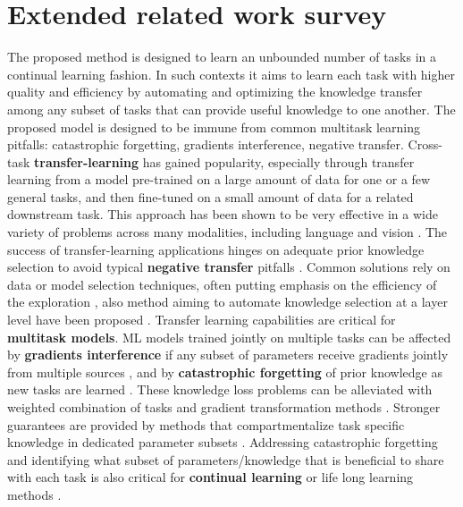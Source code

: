 \documentclass{article} \usepackage{iclr2023_conference,times}
\begin{document}
\section{Extended related work survey}
\label{sec:ex-rel}
The proposed method is designed to learn an unbounded number of tasks in a continual learning fashion.
In such contexts it aims to learn each task with higher quality and efficiency by automating and optimizing the knowledge transfer among any subset of tasks that can provide useful knowledge to one another.
The proposed model is designed to be immune from common multitask learning pitfalls: catastrophic forgetting, gradients interference, negative transfer. 
Cross-task \textbf{transfer-learning}
has gained popularity, especially through transfer learning from a model
pre-trained on a large amount of data for one or a few general tasks,
and then fine-tuned on a small amount of data for a related downstream task.
This approach has been shown to be very effective in a wide variety of problems
across many modalities, including
language \citep{Devlin2019BERTPO,Raffel2020ExploringTL} and vision \citep{Dosovitskiy2021AnII,He2016DeepRL}.
The success of transfer-learning applications hinges on adequate prior knowledge selection to avoid typical \textbf{negative transfer} pitfalls \citep{Rosenstein2005ToTO,Wang2019CharacterizingAA}.
Common solutions rely on data or model selection techniques,
often putting emphasis on the efficiency of the exploration
\citep{Zhang2020ASO,Mensink2021FactorsOI}, also method aiming to automate knowledge selection at a layer level have been proposed \citet{Sun2020AdaShareLW}.
Transfer learning capabilities are critical for \textbf{multitask models}.
ML models trained jointly on multiple tasks 
can be affected by \textbf{gradients interference} if any subset of parameters receive gradients jointly from multiple sources \citep{Chen2018GradNormGN,Yu2020GradientSF}, and by \textbf{catastrophic forgetting} of prior knowledge as new tasks are learned \citep{McCloskey1989CatastrophicII,French1999CatastrophicFI}.
These knowledge loss problems can be alleviated with weighted combination of tasks \citep{Liu2019LossBalancedTW,Sun2020ERNIE2A} and gradient transformation methods \citep{Chen2018GradNormGN,Sener2018MultiTaskLA,Kendall2018MultitaskLU}.
Stronger guarantees are provided by methods that compartmentalize task specific knowledge in dedicated parameter subsets \citep{Rebuffi2017LearningMV,Houlsby2019ParameterEfficientTL,Rusu2016ProgressiveNN,Rosenfeld2020IncrementalLT}.
Addressing catastrophic forgetting and identifying what subset of parameters/knowledge that is beneficial to share with each task is also critical for \textbf{continual learning} or life long learning methods
\citep{McCloskey1989CatastrophicII,French1999CatastrophicFI,Ramesh2022ModelZA}.
\end{document}
